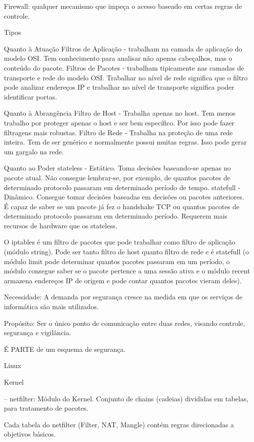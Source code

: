 Firewall: qualquer mecanismo que impeça o acesso baseado em certas regras de controle.

Tipos

Quanto à Atuação
Filtros de Aplicação - trabalham na camada de aplicação do modelo OSI. Tem conhecimento para analisar não apenas cabeçalhos, mas o conteúdo do pacote.
Filtros de Pacotes - trabalham tipicamente nas camadas de transporte e rede do modelo OSI. Trabalhar no nível de rede significa que o filtro pode analizar endereços IP e trabalhar no nível de transporte significa poder identificar portas.

Quanto à Abrangência
Filtro de Host - Trabalha apenas no host. Tem menos trabalho por proteger apenas o host e ser bem específico. Por isso pode fazer filtragens mais robustas.
Filtro de Rede - Trabalha na proteção de uma rede inteira. Tem de ser genérico e normalmente possui muitas regras. Isso pode gerar um gargalo na rede.

Quanto ao Poder
stateless - Estático. Toma decisões baseando-se apenas no pacote atual. Não consegue lembrar-se, por exemplo, de quantos pacotes de determinado protocolo passaram em determinado período de tempo.
statefull - Dinâmico. Consegue tomar decisões baseadas em decisões ou pacotes anteriores. É capaz de saber se um pacote já fez o handshake TCP ou quantos pacotes de determinado protocolo passaram em determinado período. Requerem mais recursos de hardware que os stateless.

O iptables é um filtro de pacotes que pode trabalhar como filtro de aplicação (módulo string). Pode ser tanto filtro de host quanto filtro de rede e é statefull (o módulo limit pode determinar quantos pacotes passaram em um período, o módulo consegue saber se o pacote pertence a uma sessão ativa e o módulo recent armazena endereços IP de origem e pode contar quantos pacotes vieram deles).


Necessidade: A demanda por segurança cresce na medida em que os serviços de informática são mais utilizados.

Propósito: Ser o único ponto de comunicação entre duas redes, visando controle, segurança e vigilância.

É PARTE de um esquema de segurança.

Linux

Kernel

-- netfilter: Módulo do Kernel. Conjunto de chains (cadeias) divididas em tabelas, para tratamento de pacotes.

Cada tabela do netfilter (Filter, NAT, Mangle) contém regras direcionadas a objetivos básicos.

